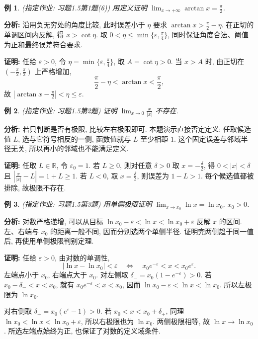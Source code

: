\documentclass[UTF8,openany]{ctexbook}
\theoremstyle{chinesetextbook}
\newtheorem{example}{例}[section]
\newenvironment{cnproof}{\par\indent\textbf{证明:} \ignorespaces}{\par}
\begin{document}
\begin{example}
(指定作业: 习题1.5第1题(6)) 用定义证明 $\displaystyle \lim_{x\to+\infty}\arctan x=\frac\pi2$.
\end{example}
\par\indent\textbf{分析:} 沿用负无穷处的角度比较, 此时误差小于 $\eta$ 要求 $\displaystyle\arctan x>\frac\pi2-\eta$. 在正切的单调区间内反解, 得 $x>\cot\eta$. 取 $\displaystyle0<\eta\le\min\{\varepsilon,\frac\pi4\}$, 同时保证角度合法、阈值为正和最终误差符合要求.
\begin{cnproof}
任给 $\varepsilon>0$, 令 $\displaystyle\eta=\min\{\varepsilon,\frac\pi4\}$, 取 $A=\cot\eta>0$. 当 $x>A$ 时, 由正切在 $\displaystyle (-\frac\pi2,\frac\pi2)$ 上严格增加,
\[
\frac\pi2-\eta<\arctan x<\frac\pi2,
\]
故 $\displaystyle |\arctan x-\frac\pi2|<\eta\le\varepsilon$.
\end{cnproof}
\begin{example}
(指定作业: 习题1.5第2题) 证明 $\displaystyle \lim_{x\to0}\frac x{|x|}$ 不存在.
\end{example}
\par\indent\textbf{分析:} 若只判断是否有极限, 比较左右极限即可. 本题演示直接否定定义: 任取候选值 $L$, 选与它符号相反的一侧, 函数值就与 $L$ 至少相距 $1$. 这个固定误差与邻域半径无关, 所以再小的邻域也不能满足定义.
\begin{cnproof}
任取 $L\in\mathbb R$, 令 $\varepsilon_0=1$. 若 $L\ge0$, 则对任意 $\delta>0$ 取 $\displaystyle x=-\frac\delta2$, 得 $0<|x|<\delta$ 且 $\displaystyle |\frac x{|x|}-L|=1+L\ge1$. 若 $L<0$, 取 $\displaystyle x=\frac\delta2$, 则误差为 $1-L>1$. 每个候选值都被排除, 故极限不存在.
\end{cnproof}
\begin{example}
(指定作业: 习题1.5第3题) 用单侧极限证明 $\displaystyle \lim_{x\to x_0}\ln x=\ln x_0$, $x_0>0$.
\end{example}
\par\indent\textbf{分析:} 对数严格递增, 可以从目标 $\ln x_0-\varepsilon<\ln x<\ln x_0+\varepsilon$ 反解 $x$ 的区间. 左、右端与 $x_0$ 的距离一般不同, 因而分别选两个单侧半径. 证明完两侧趋于同一值后, 再使用单侧极限判别定理.
\begin{cnproof}
任给 $\varepsilon>0$, 由对数的单调性,
\[
|\ln x-\ln x_0|<\varepsilon
\quad\Longleftrightarrow\quad
x_0e^{-\varepsilon}<x<x_0e^\varepsilon.
\]
左端点小于 $x_0$, 右端点大于 $x_0$. 对左侧取 $\delta_-=x_0(1-e^{-\varepsilon})>0$. 若 $x_0-\delta_-<x<x_0$, 就有 $x_0e^{-\varepsilon}<x<x_0$, 因而 $\ln x_0-\varepsilon<\ln x<\ln x_0$. 所以左极限为 $\ln x_0$.

对右侧取 $\delta_+=x_0(e^\varepsilon-1)>0$. 若 $x_0<x<x_0+\delta_+$, 同理 $\ln x_0<\ln x<\ln x_0+\varepsilon$, 所以右极限也为 $\ln x_0$. 两侧极限相等, 故 $\ln x\to\ln x_0$. 所选左端点始终为正, 也保证了对数的定义域条件.
\end{cnproof}
\end{document}
